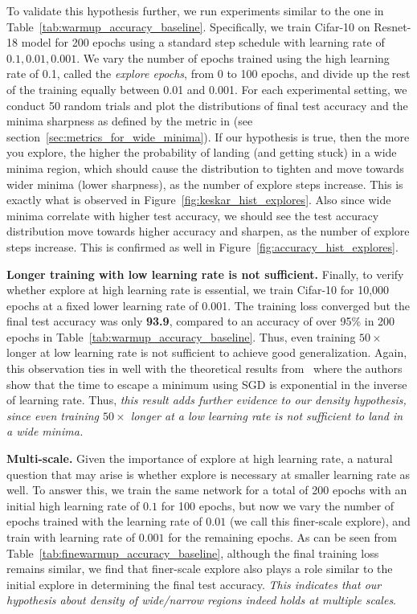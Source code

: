 \documentclass[twoside,11pt]{article}
\begin{document}
To validate this hypothesis further, we run experiments similar to the one in Table~\ref{tab:warmup_accuracy_baseline}. Specifically, we train Cifar-10 on Resnet-18 model for 200 epochs using a standard step schedule with learning rate of $0.1, 0.01, 0.001$. We vary the number of epochs trained using the high learning rate of 0.1, called the {\it explore epochs}, from 0 to 100 epochs, and divide up the rest of the training equally between 0.01 and 0.001. For each experimental setting, we conduct 50 random trials and plot the distributions of final test accuracy and the minima sharpness as defined by the metric in \cite{keskar2016large} (see section~\ref{sec:metrics_for_wide_minima}). If our hypothesis is true, then the more you explore, the higher the probability of landing (and getting stuck) in a wide minima region, which should cause the distribution to tighten and move towards wider minima (lower sharpness), as the number of explore steps increase. This is exactly what is observed in Figure~\ref{fig:keskar_hist_explores}. Also since wide minima correlate with higher test accuracy, we should see the test accuracy distribution move towards higher accuracy and sharpen, as the number of explore steps increase. This is confirmed as well in Figure~\ref{fig:accuracy_hist_explores}.

\noindent
{\bf Longer training with low learning rate is not sufficient.}
Finally, to verify whether explore at high learning rate is essential, we train Cifar-10 for 10,000 epochs at a fixed lower learning rate of 0.001. The training loss converged but the final test accuracy was only \textbf{93.9}, compared to an accuracy of over 95\% in 200 epochs in Table~\ref{tab:warmup_accuracy_baseline}. Thus, even training $50\times$ longer at low learning rate is not sufficient to achieve good generalization. Again, this observation ties in well with the theoretical results from~\citet{xie2020diffusion} where the authors show that the time to escape a minimum using SGD is exponential in the inverse of learning rate. Thus, {\it this result adds further evidence to our density hypothesis, since even training $50\times$ longer at a low
learning rate is not sufficient to land in a wide minima.}


\vspace{6pt}

\noindent
{\bf Multi-scale.} Given the importance of explore at high learning rate, a natural question that may arise is whether explore is necessary at smaller learning rate as well. To answer this, we train the same network for a total of 200 epochs with an initial high learning rate of $0.1$ for 100 epochs, but now we vary the number of epochs trained with the learning rate of $0.01$ (we call this finer-scale explore), and train with learning rate of $0.001$ for the remaining epochs. As can be seen from Table~\ref{tab:finewarmup_accuracy_baseline}, although the final training loss remains similar, we find that finer-scale explore also plays a role similar to the initial explore in determining the final test accuracy. {\it This indicates that our hypothesis about density of wide/narrow regions indeed holds at multiple scales}.
\end{document}
